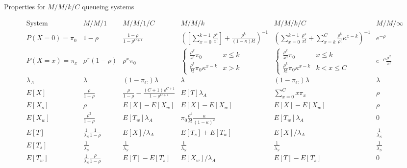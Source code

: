 \documentclass{article}
\newcommand{\utilization}{\rho}
\begin{document}
{\renewcommand{\arraystretch}{1.5}
\begin{sidewaystable}
\caption{Properties for $M/M/k/C$ queueing systems}
\label{tab:properties}
\[ \begin{array}{c|ccccc}
\mbox{System} & M/M/1 & M/M/1/C & M/M/k & M/M/k/C & M/M/\infty \\
\hline
P(X=0)=\pi_0 & 1-\utilization & \frac{1-\utilization}{1-\utilization^{C+1}} & 
\left(\left[\sum_{x=0}^{k-1} \frac{\utilization^x}{x!}\right] + \frac{\utilization^k}{(1-\kappa)k!}\right)^{-1} &
\left(\sum_{x=0}^{k-1} \frac{\utilization^x}{x!} + \sum_{x=k}^C \frac{\utilization^k}{\utilization!}\kappa^{x-k} \right)^{-1} 
& e^{-\utilization} \\
P(X=x)=\pi_x & \utilization^x (1-\utilization) & \utilization^x \pi_0 & \left\{ \begin{array}{ll} \frac{\utilization^x}{x!}\pi_0 & x\le k \\ \frac{\utilization^k}{k!}\pi_0 \kappa^{x-k} & x>k \end{array} \right. 
& \left\{ \begin{array}{ll} \frac{\utilization^x}{x!}\pi_0 & x\le k \\ \frac{\utilization^k}{k!} \pi_0\kappa ^{x-k} & k<x\le C \end{array} \right.   & e^{-\utilization} \frac{\utilization^x}{x!} \\
\hline
\lambda_A & \lambda & (1-\pi_C)\lambda & \lambda & (1-\pi_C)\lambda & \lambda \\
\hline
E[X] & \frac{\utilization}{1-\utilization} & \frac{\utilization}{1-\utilization} - \frac{(C+1)\utilization^{C+1}}{1-\utilization^{C+1}} & E[T]\lambda_A & \sum_{x=0}^C x \pi_x & \utilization \\
E[X_s] & \utilization & E[X]-E[X_w] & E[X]-E[X_w] & E[X]-E[X_w] & \utilization \\
E[X_w] & \frac{\utilization^2}{1-\utilization} & E[T_w] \lambda_A & \pi_0 \frac{\utilization^k}{k!} \frac{\kappa}{(1-\kappa)^2} & E[T_w] \lambda_A& 0 \\
E[T] & \frac{1}{\lambda_S}\frac{1}{1-\utilization} & E[X]/\lambda_A & E[T_s]+E[T_w] & E[X]/\lambda_A & \frac{1}{\lambda_S} \\
E[T_s] & \frac{1}{\lambda_S} & \frac{1}{\lambda_S} & \frac{1}{\lambda_S} & \frac{1}{\lambda_S} & \frac{1}{\lambda_S} \\
E[T_w] & \frac{1}{\lambda_S}\frac{\utilization}{1-\utilization} & E[T]-E[T_s] & E[X_w] / \lambda_A  & E[T]-E[T_s]& 0 \\
\end{array} \]
\end{sidewaystable}
}
\end{document}
